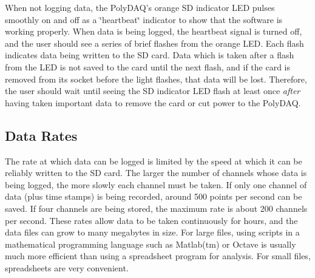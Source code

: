 When not logging data, the Poly\-D\-A\-Q's orange S\-D indicator L\-E\-D pulses smoothly on and off as a \char`\"{}heartbeat\char`\"{} indicator to show that the software is working properly. When data is being logged, the heartbeat signal is turned off, and the user should see a series of brief flashes from the orange L\-E\-D. Each flash indicates data being written to the S\-D card. Data which is taken after a flash from the L\-E\-D is not saved to the card until the next flash, and if the card is removed from its socket before the light flashes, that data will be lost. Therefore, the user should wait until seeing the S\-D indicator L\-E\-D flash at least once {\itshape after} having taken important data to remove the card or cut power to the Poly\-D\-A\-Q.\hypertarget{pd_setup_pds_sd_rate}{}\subsection{Data Rates}\label{pd_setup_pds_sd_rate}
The rate at which data can be logged is limited by the speed at which it can be reliably written to the S\-D card. The larger the number of channels whose data is being logged, the more slowly each channel must be taken. If only one channel of data (plus time stamps) is being recorded, around 500 points per second can be saved. If four channels are being stored, the maximum rate is about 200 channels per second. These rates allow data to be taken continuously for hours, and the data files can grow to many megabytes in size. For large files, using scripts in a mathematical programming language such as Matlab(tm) or Octave is usually much more efficient than using a spreadsheet program for analysis. For small files, spreadsheets are very convenient.

